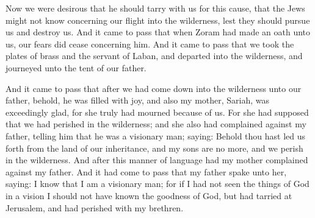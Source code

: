 Now we were desirous that he should tarry with us for this cause, that the Jews might not know concerning our flight into the wilderness, lest they should pursue us and destroy us.
\bverse \iffalse And it came to pass that when Zoram had made an oath unto us, our fears did cease concerning him. \fi
And it came to pass that when Zoram had made an oath unto us, our fears did cease concerning him.
\bverse \iffalse And it came to pass that we took the plates of brass and the servant of Laban, and departed into the wilderness, and journeyed unto the tent of our father. \fi
And it came to pass that we took the plates of brass and the servant of Laban, and departed into the wilderness, and journeyed unto the tent of our father.

\bchapter
\bverse \iffalse And it came to pass that after we had come down into the wilderness unto our father, behold, he was filled with joy, and also my mother, Sariah, was exceedingly glad, for she truly had mourned because of us. \fi
And it came to pass that after we had come down into the wilderness unto our father, behold, he was filled with joy, and also my mother, Sariah, was exceedingly glad, for she truly had mourned because of us.
\bverse \iffalse For she had supposed that we had perished in the wilderness; and she also had complained against my father, telling him that he was a visionary man; saying: Behold thou hast led us forth from the land of our inheritance, and my sons are no more, and we perish in the wilderness. \fi
For she had supposed that we had perished in the wilderness; and she also had complained against my father, telling him that he was a visionary man; saying: Behold thou hast led us forth from the land of our inheritance, and my sons are no more, and we perish in the wilderness.
\bverse \iffalse And after this manner of language had my mother complained against my father. \fi
And after this manner of language had my mother complained against my father.
\bverse \iffalse And it had come to pass that my father spake unto her, saying: I know that I am a visionary man; for if I had not seen the things of God in a vision I should not have known the goodness of God, but had tarried at Jerusalem, and had perished with my brethren. \fi
And it had come to pass that my father spake unto her, saying: I know that I am a visionary man; for if I had not seen the things of God in a vision I should not have known the goodness of God, but had tarried at Jerusalem, and had perished with my brethren.
